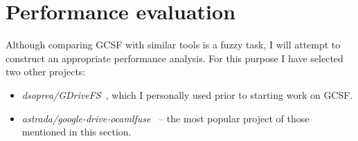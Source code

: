 
\freshreaddata

\cachereaddata

\mountingtimes

\treetimes



\chapter{Performance evaluation}\label{performance_evaluation}

Although comparing GCSF with similar tools is a fuzzy task, I will attempt to construct an appropriate performance analysis. For this purpose I have selected two other projects:

\begin{itemize}
  \itemsep0em
  \item \emph{dsoprea/GDriveFS}~\cite{dsoprea/GDriveFS}, which I personally used prior to starting work on GCSF.
  \item \emph{astrada/google-drive-ocamlfuse}~\cite{astrada/google-drive-ocamlfuse} -- the most popular project of those mentioned in this section.
\end{itemize}

